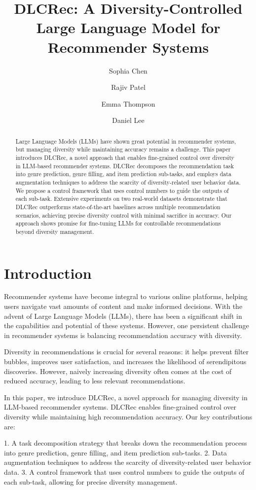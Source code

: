 \documentclass[12pt,letterpaper]{article}
\title{DLCRec: A Diversity-Controlled Large Language Model for Recommender Systems}
\author{Sophia Chen \and Rajiv Patel \and Emma Thompson \and Daniel Lee}
\begin{document}
\maketitle

\begin{abstract}
Large Language Models (LLMs) have shown great potential in recommender systems, but managing diversity while maintaining accuracy remains a challenge. This paper introduces DLCRec, a novel approach that enables fine-grained control over diversity in LLM-based recommender systems. DLCRec decomposes the recommendation task into genre prediction, genre filling, and item prediction sub-tasks, and employs data augmentation techniques to address the scarcity of diversity-related user behavior data. We propose a control framework that uses control numbers to guide the outputs of each sub-task. Extensive experiments on two real-world datasets demonstrate that DLCRec outperforms state-of-the-art baselines across multiple recommendation scenarios, achieving precise diversity control with minimal sacrifice in accuracy. Our approach shows promise for fine-tuning LLMs for controllable recommendations beyond diversity management.
\end{abstract}

\section{Introduction}

Recommender systems have become integral to various online platforms, helping users navigate vast amounts of content and make informed decisions. With the advent of Large Language Models (LLMs), there has been a significant shift in the capabilities and potential of these systems. However, one persistent challenge in recommender systems is balancing recommendation accuracy with diversity.

Diversity in recommendations is crucial for several reasons: it helps prevent filter bubbles, improves user satisfaction, and increases the likelihood of serendipitous discoveries. However, naively increasing diversity often comes at the cost of reduced accuracy, leading to less relevant recommendations.

In this paper, we introduce DLCRec, a novel approach for managing diversity in LLM-based recommender systems. DLCRec enables fine-grained control over diversity while maintaining high recommendation accuracy. Our key contributions are:

1. A task decomposition strategy that breaks down the recommendation process into genre prediction, genre filling, and item prediction sub-tasks.
2. Data augmentation techniques to address the scarcity of diversity-related user behavior data.
3. A control framework that uses control numbers to guide the outputs of each sub-task, allowing for precise diversity management.
\end{document}
